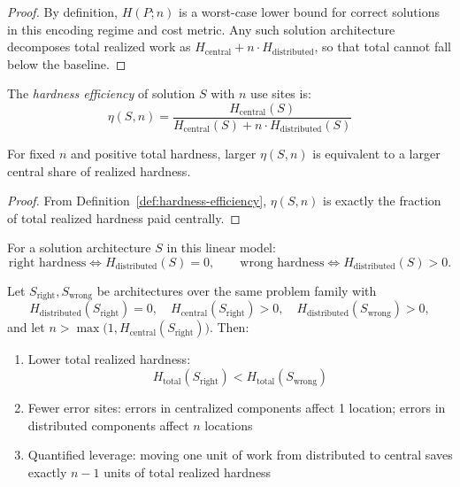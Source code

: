 \begin{proof}
By definition, $H(P;n)$ is a worst-case lower bound for correct solutions in this encoding regime and cost metric. Any such solution architecture decomposes total realized work as $H_{\text{central}} + n\cdot H_{\text{distributed}}$, so that total cannot fall below the baseline.
\end{proof}

\begin{definition}\label{def:hardness-efficiency}
The \emph{hardness efficiency} of solution $S$ with $n$ use sites is:
\[\eta(S, n) = \frac{H_{\text{central}}(S)}{H_{\text{central}}(S) + n \cdot H_{\text{distributed}}(S)}\]
\end{definition}

\begin{proposition}\label{prop:hardness-efficiency-interpretation}
For fixed $n$ and positive total hardness, larger $\eta(S,n)$ is equivalent to a larger central share of realized hardness.
\end{proposition}

\begin{proof}
From Definition~\ref{def:hardness-efficiency}, $\eta(S,n)$ is exactly the fraction of total realized hardness paid centrally.
\end{proof}

\begin{definition}\label{def:right-wrong-placement}
For a solution architecture $S$ in this linear model:
\[
\text{right hardness} \iff H_{\mathrm{distributed}}(S)=0,\qquad
\text{wrong hardness} \iff H_{\mathrm{distributed}}(S)>0.
\]
\end{definition}

\begin{theorem}\label{thm:centralization-dominance}
Let $S_{\mathrm{right}}, S_{\mathrm{wrong}}$ be architectures over the same problem family with
\[
H_{\mathrm{distributed}}(S_{\mathrm{right}})=0,\quad
H_{\mathrm{central}}(S_{\mathrm{right}})>0,\quad
H_{\mathrm{distributed}}(S_{\mathrm{wrong}})>0,
\]
and let $n > \max\!\bigl(1, H_{\mathrm{central}}(S_{\mathrm{right}})\bigr)$. Then:
\begin{enumerate}
\item Lower total realized hardness:
\[
H_{\text{total}}(S_{\mathrm{right}}) < H_{\text{total}}(S_{\mathrm{wrong}})
\]
\item Fewer error sites: errors in centralized components affect 1 location; errors in distributed components affect $n$ locations
\item Quantified leverage: moving one unit of work from distributed to central saves exactly $n-1$ units of total realized hardness
\end{enumerate}
\end{theorem}

